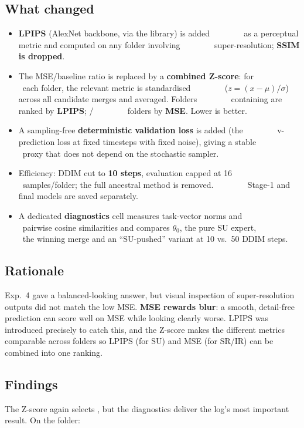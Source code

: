 \subsection*{What changed}
\begin{itemize}[nosep,leftmargin=1.4em]
   \item \textbf{LPIPS} (AlexNet backbone, via the  library) is added
         as a perceptual metric and computed on any folder involving
         super-resolution; \textbf{SSIM is dropped}.
   \item The MSE/baseline ratio is replaced by a \textbf{combined Z-score}: for
         each folder, the relevant metric is standardised
         ($z=(x-\mu)/\sigma$) across all candidate merges and averaged. Folders
         containing  are ranked by \textbf{LPIPS}; /
         folders by \textbf{MSE}. Lower is better.
   \item A sampling-free \textbf{deterministic validation loss} is added (the
         v-prediction loss at fixed timesteps with fixed noise), giving a stable
         proxy that does not depend on the stochastic sampler.
   \item Efficiency: DDIM cut to \textbf{10 steps}, evaluation capped at 16
         samples/folder; the full ancestral  method is removed.
         Stage-1 and final models are saved separately.
   \item A dedicated \textbf{diagnostics} cell measures task-vector norms and
         pairwise cosine similarities and compares $\theta_0$, the pure SU expert,
         the winning merge and an ``SU-pushed'' variant at 10 vs.\ 50 DDIM steps.
\end{itemize}

\subsection*{Rationale}
Exp.~4 gave a balanced-looking answer, but visual inspection of super-resolution
outputs did not match the low MSE. \textbf{MSE rewards blur}: a smooth,
detail-free prediction can score well on MSE while looking clearly worse. LPIPS
was introduced precisely to catch this, and the Z-score makes the different
metrics comparable across folders so LPIPS (for SU) and MSE (for SR/IR) can be
combined into one ranking.

\subsection*{Findings}
The Z-score again selects \textbf{}, but the diagnostics
deliver the log's most important result. On the  folder:

